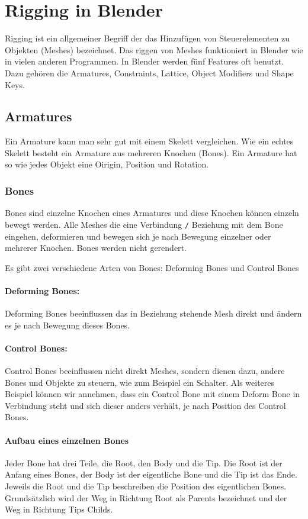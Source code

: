 \section{Rigging in Blender}
Rigging ist ein allgemeiner Begriff der das Hinzufügen von Steuerelementen zu Objekten (Meshes) bezeichnet.
Das riggen von Meshes funktioniert in Blender wie in vielen anderen Programmen.
In Blender werden fünf Features oft benutzt. Dazu gehören die Armatures, Constraints, Lattice, Object Modifiers und Shape Keys.

\subsection{Armatures}
Ein Armature kann man sehr gut mit einem Skelett vergleichen.
Wie ein echtes Skelett besteht ein Armature aus mehreren Knochen (Bones). Ein Armature hat so wie jedes Objekt eine Oirigin,
Position und Rotation.

\subsubsection{Bones}
Bones sind einzelne Knochen eines Armatures und diese Knochen können einzeln bewegt werden.
Alle Meshes die eine Verbindung \verb-/- Beziehung mit dem Bone eingehen, deformieren und bewegen sich je nach Bewegung einzelner oder mehrerer Knochen. Bones werden nicht gerendert.

Es gibt zwei verschiedene Arten von Bones: Deforming Bones und Control Bones

\paragraph{Deforming Bones:}
Deforming Bones beeinflussen das in Beziehung stehende Mesh direkt und ändern es je nach Bewegung dieses Bones.

\paragraph{Control Bones:}
Control Bones beeinflussen nicht direkt Meshes, sondern dienen dazu, andere Bones und Objekte zu steuern, wie zum Beispiel ein Schalter.
Als weiteres Beispiel können wir annehmen, dass ein Control Bone mit einem Deform Bone in Verbindung steht und sich dieser anders verhält, je nach Position des Control Bones.

\paragraph{Aufbau eines einzelnen Bones}
Jeder Bone hat drei Teile, die Root, den Body und die Tip. Die Root ist der Anfang eines Bones, der Body ist der eigentliche Bone und die Tip ist das Ende.
Jeweils die Root und die Tip beschreiben die Position des eigentlichen Bones.
Grundsätzlich wird der Weg in Richtung Root als Parents bezeichnet und der Weg in Richtung Tips Childs.

